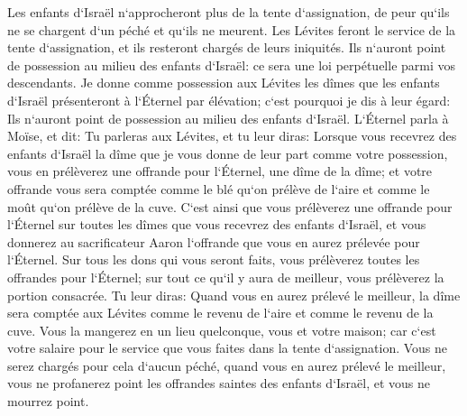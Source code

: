 \verse Les enfants d`Israël n`approcheront plus de la tente d`assignation, de peur qu`ils ne se chargent d`un péché et qu`ils ne meurent. 
\verse Les Lévites feront le service de la tente d`assignation, et ils resteront chargés de leurs iniquités. Ils n`auront point de possession au milieu des enfants d`Israël: ce sera une loi perpétuelle parmi vos descendants. 
\verse Je donne comme possession aux Lévites les dîmes que les enfants d`Israël présenteront à l`Éternel par élévation; c`est pourquoi je dis à leur égard: Ils n`auront point de possession au milieu des enfants d`Israël. 
\verse L`Éternel parla à Moïse, et dit: 
\verse Tu parleras aux Lévites, et tu leur diras: Lorsque vous recevrez des enfants d`Israël la dîme que je vous donne de leur part comme votre possession, vous en prélèverez une offrande pour l`Éternel, une dîme de la dîme; 
\verse et votre offrande vous sera comptée comme le blé qu`on prélève de l`aire et comme le moût qu`on prélève de la cuve. 
\verse C`est ainsi que vous prélèverez une offrande pour l`Éternel sur toutes les dîmes que vous recevrez des enfants d`Israël, et vous donnerez au sacrificateur Aaron l`offrande que vous en aurez prélevée pour l`Éternel. 
\verse Sur tous les dons qui vous seront faits, vous prélèverez toutes les offrandes pour l`Éternel; sur tout ce qu`il y aura de meilleur, vous prélèverez la portion consacrée. 
\verse Tu leur diras: Quand vous en aurez prélevé le meilleur, la dîme sera comptée aux Lévites comme le revenu de l`aire et comme le revenu de la cuve. 
\verse Vous la mangerez en un lieu quelconque, vous et votre maison; car c`est votre salaire pour le service que vous faites dans la tente d`assignation. 
\verse Vous ne serez chargés pour cela d`aucun péché, quand vous en aurez prélevé le meilleur, vous ne profanerez point les offrandes saintes des enfants d`Israël, et vous ne mourrez point. 

